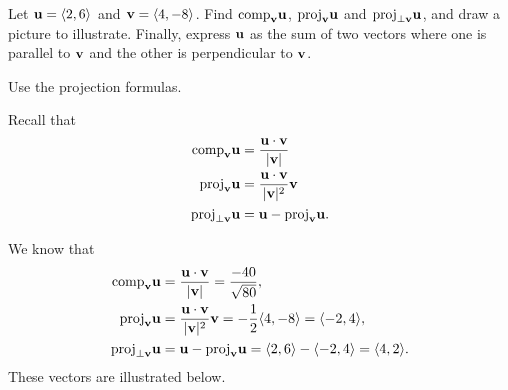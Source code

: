 \begin{activity} \label{A:9.3.4}  Let $\mathbf{u} = \langle 2, 6 \rangle$ and $\mathbf{v} = \langle 4, -8 \rangle$. Find $\text{comp}_{\mathbf{v}} \mathbf{u}$, $\text{proj}_{\mathbf{v}} \mathbf{u}$ and $\text{proj}_{\perp \mathbf{v}} \mathbf{u}$, and draw a picture to illustrate.  Finally, express $\mathbf{u}$ as the sum of two vectors where one is parallel to $\mathbf{v}$ and the other is perpendicular to $\mathbf{v}$.
\end{activity}
\begin{smallhint}
Use the projection formulas.
\end{smallhint}
\begin{bighint}
Recall that 
\begin{align*}
\text{comp}_{\mathbf{v}} \mathbf{u} &= \frac{\mathbf{u} \cdot \mathbf{v}}{|\mathbf{v}|} \\
\text{proj}_{\mathbf{v}} \mathbf{u} &= \frac{\mathbf{u} \cdot \mathbf{v}}{|\mathbf{v}|^2} \mathbf{v} \\
\text{proj}_{\perp \mathbf{v}} \mathbf{u} &= \mathbf{u} - \text{proj}_{\mathbf{v}} \mathbf{u}.
\end{align*}
\end{bighint}
\begin{activitySolution}
We know that 
\begin{align*}
\text{comp}_{\mathbf{v}} \mathbf{u} &= \frac{\mathbf{u} \cdot \mathbf{v}}{|\mathbf{v}|} = \frac{-40}{\sqrt{80}}, \\
\text{proj}_{\mathbf{v}} \mathbf{u} &= \frac{\mathbf{u} \cdot \mathbf{v}}{|\mathbf{v}|^2} \mathbf{v} = -\frac{1}{2}\langle 4, -8 \rangle = \langle -2, 4 \rangle, \\
\text{proj}_{\perp \mathbf{v}} \mathbf{u} &= \mathbf{u} - \text{proj}_{\mathbf{v}} \mathbf{u} = \langle 2, 6 \rangle - \langle -2, 4 \rangle = \langle 4,2\rangle.
\end{align*}
These vectors are illustrated below. 

\begin{center}
\end{center}

\end{activitySolution}
\aftera